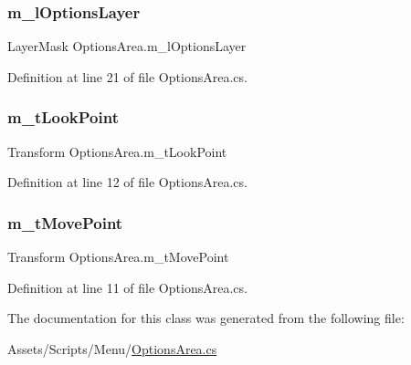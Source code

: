 \subsubsection{\texorpdfstring{m\+\_\+l\+Options\+Layer}{m\_lOptionsLayer}}
{\footnotesize\ttfamily Layer\+Mask Options\+Area.\+m\+\_\+l\+Options\+Layer}



Definition at line 21 of file Options\+Area.\+cs.

\mbox{\label{class_options_area_a7aa5c91471e3a5bcdbf0e38e3be8cacc}} 
\subsubsection{\texorpdfstring{m\+\_\+t\+Look\+Point}{m\_tLookPoint}}
{\footnotesize\ttfamily Transform Options\+Area.\+m\+\_\+t\+Look\+Point}



Definition at line 12 of file Options\+Area.\+cs.

\mbox{\label{class_options_area_a1de4aba313b17d844664ea81e7fec4bb}} 
\subsubsection{\texorpdfstring{m\+\_\+t\+Move\+Point}{m\_tMovePoint}}
{\footnotesize\ttfamily Transform Options\+Area.\+m\+\_\+t\+Move\+Point}



Definition at line 11 of file Options\+Area.\+cs.



The documentation for this class was generated from the following file\+:\begin{DoxyCompactItemize}
\item 
Assets/\+Scripts/\+Menu/\mbox{\hyperlink{_options_area_8cs}{Options\+Area.\+cs}}\end{DoxyCompactItemize}
